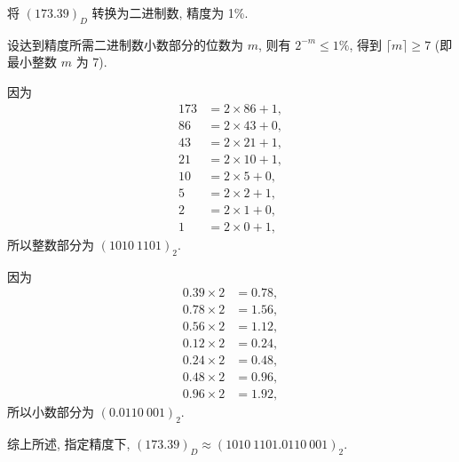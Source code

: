 \begin{exampleprob}[十进制数转换为二进制数]
    将 $(173.39)_D$ 转换为二进制数, 精度为 1\%.

    \begin{solution}
        设达到精度所需二进制数小数部分的位数为 $m$, 则有 $2^{-m}\leq1\%$, 得到 $\lceil m\rceil\geq 7$ (即最小整数 $m$ 为 7).

        因为
        \begin{equation*}
            \begin{aligned}
                173 & =2\times86+1, \\
                86  & =2\times43+0, \\
                43  & =2\times21+1, \\
                21  & =2\times10+1, \\
                10  & =2\times5+0,  \\
                5   & =2\times2+1,  \\
                2   & =2\times1+0,  \\
                1   & =2\times0+1,
            \end{aligned}
        \end{equation*}
        所以整数部分为 $(1010\ 1101)_2$.

        因为
        \begin{equation*}
            \begin{aligned}
                0.39\times2 & =0.78, \\
                0.78\times2 & =1.56, \\
                0.56\times2 & =1.12, \\
                0.12\times2 & =0.24, \\
                0.24\times2 & =0.48, \\
                0.48\times2 & =0.96, \\
                0.96\times2 & =1.92,
            \end{aligned}
        \end{equation*}
        所以小数部分为 $(0.0110\ 001)_2$.

        综上所述, 指定精度下, $(173.39)_D\approx(1010\ 1101.0110\ 001)_2$.
    \end{solution}
\end{exampleprob}
